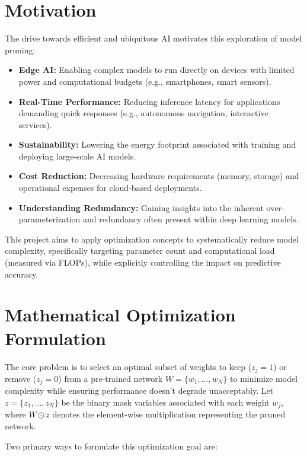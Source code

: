 \documentclass[conference]{IEEEtran} %
\begin{document}
\section{Motivation}
The drive towards efficient and ubiquitous AI motivates this exploration of model pruning:
\begin{itemize}
    \item \textbf{Edge AI:} Enabling complex models to run directly on devices with limited power and computational budgets (e.g., smartphones, smart sensors).
    \item \textbf{Real-Time Performance:} Reducing inference latency for applications demanding quick responses (e.g., autonomous navigation, interactive services).
    \item \textbf{Sustainability:} Lowering the energy footprint associated with training and deploying large-scale AI models.
    \item \textbf{Cost Reduction:} Decreasing hardware requirements (memory, storage) and operational expenses for cloud-based deployments.
    \item \textbf{Understanding Redundancy:} Gaining insights into the inherent over-parameterization and redundancy often present within deep learning models.
\end{itemize}
This project aims to apply optimization concepts to systematically reduce model complexity, specifically targeting parameter count and computational load (measured via FLOPs), while explicitly controlling the impact on predictive accuracy.

\section{Mathematical Optimization Formulation}
The core problem is to select an optimal subset of weights to keep ($z_j=1$) or remove ($z_j=0$) from a pre-trained network $W = \{w_1, ..., w_N\}$ to minimize model complexity while ensuring performance doesn't degrade unacceptably. Let $z = \{z_1, ..., z_N\}$ be the binary mask variables associated with each weight $w_j$, where $W \odot z$ denotes the element-wise multiplication representing the pruned network.

Two primary ways to formulate this optimization goal are:
\end{document}
